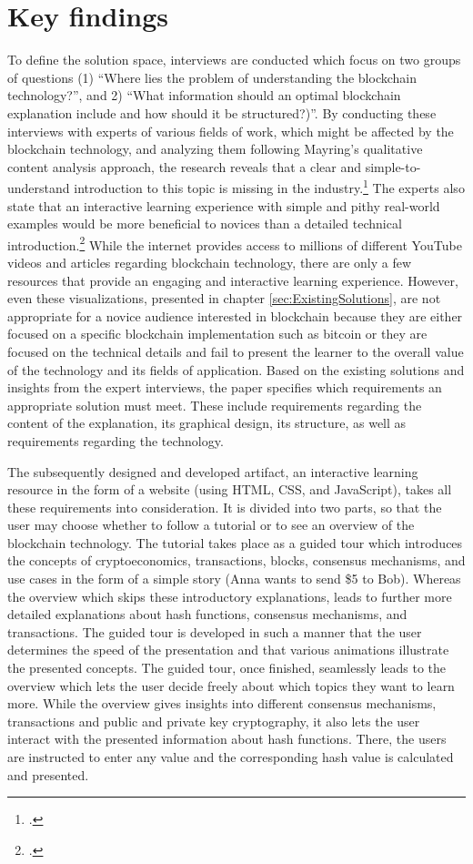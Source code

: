 \section{Key findings}
To define the solution space, interviews are conducted which focus on two groups of questions (1) \enquote{Where lies the problem of understanding the blockchain technology?}, and 2) \enquote{What information should an optimal blockchain explanation include and how should it be structured?)}.
By conducting these interviews with experts of various fields of work, which might be affected by the blockchain technology, and analyzing them following Mayring's qualitative content analysis approach, the research reveals that a clear and simple-to-understand introduction to this topic is missing in the industry.\footcite[Cf.][]{DanielKaltenbach_Interview} The experts also state that an interactive learning experience with simple and pithy real-world examples would be more beneficial to novices than a detailed technical introduction.\footcite[Cf.][]{BjoernPaulewicz_Interview} While the internet provides access to millions of different YouTube videos and articles regarding blockchain technology, there are only a few resources that provide an engaging and interactive learning experience. However, even these visualizations, presented in chapter \ref{sec:ExistingSolutions}, are not appropriate for a novice audience interested in blockchain because they are either focused on a specific blockchain implementation such as bitcoin or they are focused on the technical details and fail to present the learner to the overall value of the technology and its fields of application. Based on the existing solutions and insights from the expert interviews, the paper specifies which requirements an appropriate solution must meet. These include requirements regarding the content of the explanation, its graphical design, its structure, as well as requirements regarding the technology.

The subsequently designed and developed artifact, an interactive learning resource in the form of a website (using HTML, CSS, and JavaScript), takes all these requirements into consideration. It is divided into two parts, so that the user may choose whether to follow a tutorial or to see an overview of the blockchain technology. The tutorial takes place as a guided tour which introduces the concepts of cryptoeconomics, transactions, blocks, consensus mechanisms, and use cases in the form of a simple story (Anna wants to send \$5 to Bob). Whereas the overview which skips these introductory explanations, leads to further more detailed explanations about hash functions, consensus mechanisms, and transactions. The guided tour is developed in such a manner that the user determines the speed of the presentation and that various animations illustrate the presented concepts. The guided tour, once finished, seamlessly leads to the overview which lets the user decide freely about which topics they want to learn more. While the overview gives insights into different consensus mechanisms, transactions and public and private key cryptography, it also lets the user interact with the presented information about hash functions. There, the users are instructed to enter any value and the corresponding hash value is calculated and presented.

